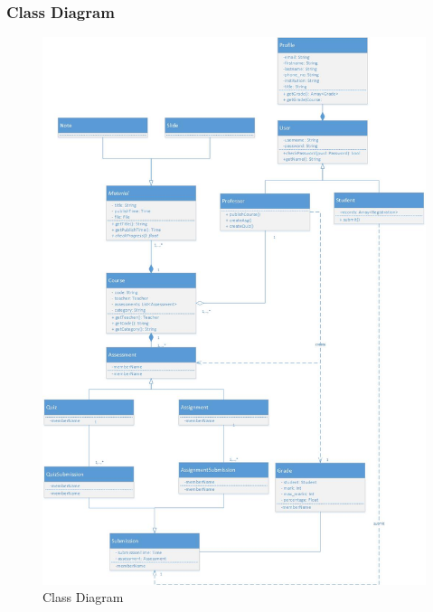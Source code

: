 \documentclass{beamer}
\begin{document}
\begin{frame}
	\frametitle{Class Diagram}
	\begin{figure}[!ht]
		\begin{center}
			\includegraphics[width=\textwidth,height=0.7\textheight,keepaspectratio]{class}
		\end{center}
		\caption{Class Diagram}
	\end{figure}
	
\end{frame}
\end{document}
